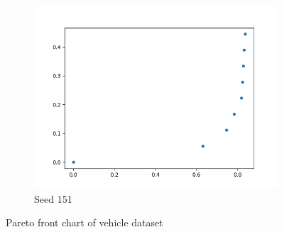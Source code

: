 \documentclass{article}
\begin{document}
\begin{figure}[h!]
\begin{subfigure}[b]{0.3\linewidth}
		\includegraphics[width=\linewidth]{vehicle_151.png}
		\caption{Seed 151}
	\end{subfigure}
	\caption{Pareto front chart of vehicle dataset}
\end{figure}
\end{document}
